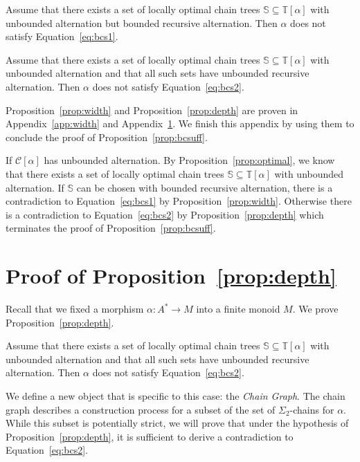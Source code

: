 \documentclass[envcountsame]{llncs}
\newcounter{sauvegarde}
\newcommand\adjustc[1]{\protect{\setcounter{sauvegarde}{\thetheorem}
  \setcounterref{theorem}{#1}
  \addtocounter{theorem}{-1}
}}
\newcommand\restorec{
\setcounter{theorem}{\thesauvegarde}
}
\newcommand\Cs{\ensuremath{\mathcal{C}}\xspace}
\newcommand\ct{\ensuremath{\mathbb{T}}\xspace}
\newcommand\cs{\ensuremath{\mathbb{S}}\xspace}
\newcommand{\sic}[1]{\ensuremath{\Sigma_{#1}}\xspace}
\newcommand\chain{chain\xspace}
\newcommand\qchains[1]{\ensuremath{\sic{#1}}-chains\xspace}
\newcommand\Chain{Chain\xspace}
\newcommand\dchains{\qchains{2}}
\begin{document}
\begin{proposition} \label{prop:width}
  Assume that there exists a set of locally optimal \chain trees $\cs
  \subseteq \ct[\alpha]$ with unbounded alternation but bounded
  recursive alternation. Then $\alpha$ does not satisfy
  Equation~\eqref{eq:bcs1}.
\end{proposition}

\begin{proposition} \label{prop:depth}
  Assume that there exists a set of locally optimal \chain
  trees $\cs \subseteq \ct[\alpha]$ with unbounded alternation and that
  all such sets have unbounded recursive alternation. Then $\alpha$ does
  not satisfy Equation~\eqref{eq:bcs2}.
\end{proposition}

Proposition~\ref{prop:width} and Proposition~\ref{prop:depth} are
proven in Appendix~\ref{app:width} and Appendix~\ref{app:depth}. We
finish this appendix by using them to conclude the proof of
Proposition~\ref{prop:bcsuff}.

If $\Cs[\alpha]$ has unbounded alternation. By
Proposition~\ref{prop:optimal}, we know that there exists a set of
locally optimal \chain trees $\cs \subseteq \ct[\alpha]$ with
unbounded alternation. If $\cs$ can be chosen with bounded recursive
alternation, there is a contradiction to Equation~\eqref{eq:bcs1} by
Proposition~\ref{prop:width}. Otherwise there is a contradiction to
Equation~\eqref{eq:bcs2} by Proposition~\ref{prop:depth} which
terminates the proof of Proposition~\ref{prop:bcsuff}.


\section{Proof of Proposition~\ref{prop:depth}}
\label{app:depth}
Recall that we fixed a morphism $\alpha: A^* \rightarrow M$ into a
finite monoid $M$. We prove Proposition~\ref{prop:depth}.

\adjustc{prop:depth}
\begin{proposition}
  Assume that there exists a set of locally optimal \chain
  trees $\cs \subseteq \ct[\alpha]$ with unbounded alternation and that
  all such sets have unbounded recursive alternation. Then $\alpha$ does
  not satisfy Equation~\eqref{eq:bcs2}.
\end{proposition}
\restorec

We define a new object that is specific to this case: the \emph{\Chain
  Graph}. The \chain graph describes a construction process for a subset
of the set of \dchains for $\alpha$. While this subset is potentially
strict, we will prove that under the hypothesis of
Proposition~\ref{prop:depth}, it is sufficient to derive a
contradiction to Equation~\eqref{eq:bcs2}.
\end{document}
